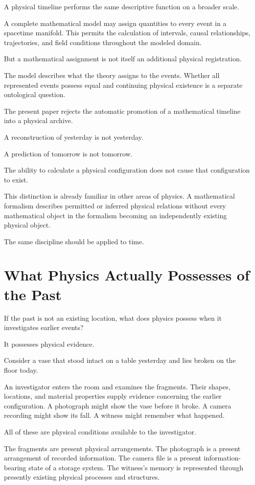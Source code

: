 \documentclass[12pt,onecolumn]{article}
\begin{document}
A physical timeline performs the same descriptive function on a broader scale.

A complete mathematical model may assign quantities to every event in a spacetime manifold. This permits the calculation of intervals, causal relationships, trajectories, and field conditions throughout the modeled domain.

But a mathematical assignment is not itself an additional physical registration.

The model describes what the theory assigns to the events. Whether all represented events possess equal and continuing physical existence is a separate ontological question.

The present paper rejects the automatic promotion of a mathematical timeline into a physical archive.

A reconstruction of yesterday is not yesterday.

A prediction of tomorrow is not tomorrow.

The ability to calculate a physical configuration does not cause that configuration to exist.

This distinction is already familiar in other areas of physics. A mathematical formalism describes permitted or inferred physical relations without every mathematical object in the formalism becoming an independently existing physical object.

The same discipline should be applied to time.

\section{What Physics Actually Possesses of the Past}

If the past is not an existing location, what does physics possess when it investigates earlier events?

It possesses physical evidence.

Consider a vase that stood intact on a table yesterday and lies broken on the floor today.

An investigator enters the room and examines the fragments. Their shapes, locations, and material properties supply evidence concerning the earlier configuration. A photograph might show the vase before it broke. A camera recording might show its fall. A witness might remember what happened.

All of these are physical conditions available to the investigator.

The fragments are present physical arrangements. The photograph is a present arrangement of recorded information. The camera file is a present information-bearing state of a storage system. The witness's memory is represented through presently existing physical processes and structures.
\end{document}
